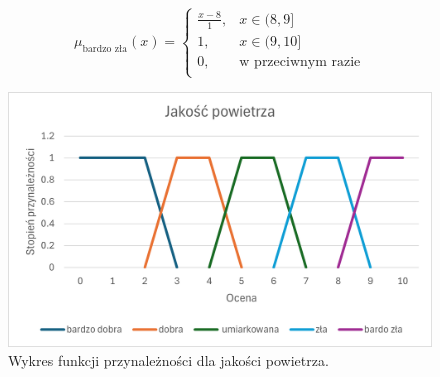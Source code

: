 \documentclass{article}
\begin{document}
\begin{enumerate}
                \begin{equation}
                    \mu_{\text{bardzo zła}}(x) =
                    \begin{cases}
                    \frac{x - 8}{1}, &  x \in (8, 9] \\
                    1, & x \in (9, 10] \\
                    0, & \text{w przeciwnym razie} \\
                    \end{cases}
                \end{equation}

    \begin{figure}[H]
    \centering
    \includegraphics[width=\textwidth]{img/air.png}
    \caption{Wykres funkcji przynależności dla jakości powietrza.}
    \end{figure}
\end{enumerate}
\end{document}
